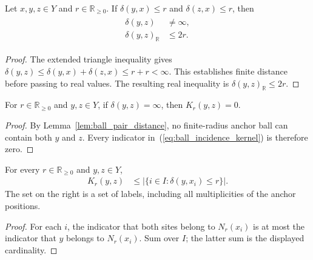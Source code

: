 \begin{lemma}
    \label{lem:ball_pair_distance}
    \leanok
    Let $x,y,z\in Y$ and $r\in\mathbb R_{\geq0}$.
    If $\delta(y,x)\leq r$ and $\delta(z,x)\leq r$, then
    \begin{align}
        \begin{aligned}
            \delta(y,z)             & \ne\infty, \\
            \delta(y,z)_{\mathbb R} & \leq2r.
        \end{aligned}
        \label{eq:ball_pair_distance}
    \end{align}
\end{lemma}
\begin{proof}
    \leanok
    The extended triangle inequality gives
    $\delta(y,z)\leq\delta(y,x)+\delta(z,x)\leq r+r<\infty$.
    This establishes finite distance before passing to real values.
    The resulting real inequality is $\delta(y,z)_{\mathbb R}\leq2r$.
\end{proof}

\begin{lemma}
    \label{lem:ball_incidence_zero}
    \leanok
    For $r\in\mathbb R_{\geq0}$ and $y,z\in Y$, if
    $\delta(y,z)=\infty$, then $K_r(y,z)=0$.
\end{lemma}
\begin{proof}
    \leanok
    By Lemma~\ref{lem:ball_pair_distance}, no finite-radius anchor
    ball can contain both $y$ and $z$.  Every indicator
    in~(\ref{eq:ball_incidence_kernel}) is therefore zero.
\end{proof}

\begin{lemma}
    \label{lem:ball_incidence_label_bound}
    \leanok
    For every $r\in\mathbb R_{\geq0}$ and $y,z\in Y$,
    \begin{align}
        K_r(y,z) & \leq\bigl|\{i\in I:\delta(y,x_i)\leq r\}\bigr|.
        \label{eq:ball_incidence_label_bound}
    \end{align}
    The set on the right is a set of labels, including all multiplicities
    of the anchor positions.
\end{lemma}
\begin{proof}
    \leanok
    For each $i$, the indicator that both sites belong to $N_r(x_i)$
    is at most the indicator that $y$ belongs to $N_r(x_i)$.
    Sum over $I$; the latter sum is the displayed cardinality.
\end{proof}

